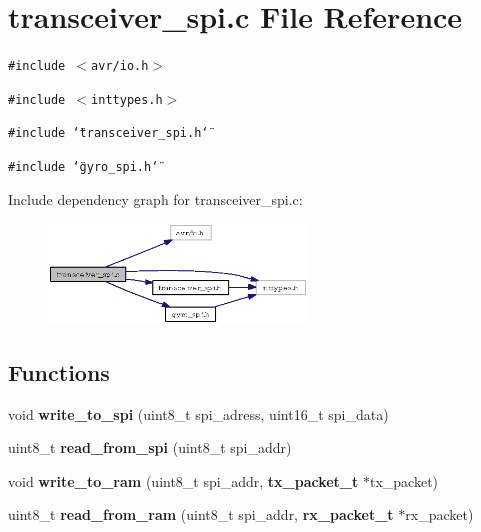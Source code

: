 \section{transceiver\_\-spi.c File Reference}
\label{transceiver__spi_8c}
{\tt \#include $<$avr/io.h$>$}\par
{\tt \#include $<$inttypes.h$>$}\par
{\tt \#include \char`\"{}transceiver\_\-spi.h\char`\"{}}\par
{\tt \#include \char`\"{}gyro\_\-spi.h\char`\"{}}\par


Include dependency graph for transceiver\_\-spi.c:\begin{figure}[H]
\begin{center}
\leavevmode
\includegraphics[width=195pt]{transceiver__spi_8c__incl}
\end{center}
\end{figure}
\subsection*{Functions}
\begin{CompactItemize}
\item 
void {\bf write\_\-to\_\-spi} (uint8\_\-t spi\_\-adress, uint16\_\-t spi\_\-data)
\item 
uint8\_\-t {\bf read\_\-from\_\-spi} (uint8\_\-t spi\_\-addr)
\item 
void {\bf write\_\-to\_\-ram} (uint8\_\-t spi\_\-addr, {\bf tx\_\-packet\_\-t} $\ast$tx\_\-packet)
\item 
uint8\_\-t {\bf read\_\-from\_\-ram} (uint8\_\-t spi\_\-addr, {\bf rx\_\-packet\_\-t} $\ast$rx\_\-packet)
\end{CompactItemize}

